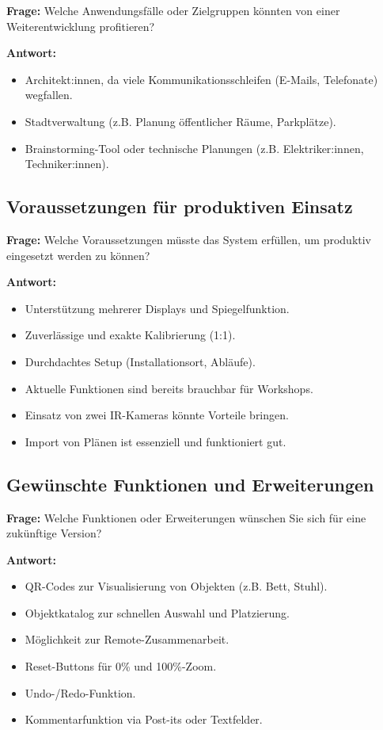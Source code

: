 \textbf{Frage:} Welche Anwendungsfälle oder Zielgruppen könnten von einer Weiterentwicklung profitieren?

\textbf{Antwort:}
\begin{itemize}
    \item Architekt:innen, da viele Kommunikationsschleifen (E-Mails, Telefonate) wegfallen.
    \item Stadtverwaltung (z.B. Planung öffentlicher Räume, Parkplätze).
    \item Brainstorming-Tool oder technische Planungen (z.B. Elektriker:innen, Techniker:innen).
\end{itemize}

\subsection{Voraussetzungen für produktiven Einsatz}

\textbf{Frage:} Welche Voraussetzungen müsste das System erfüllen, um produktiv eingesetzt werden zu können?

\textbf{Antwort:}
\begin{itemize}
    \item Unterstützung mehrerer Displays und Spiegelfunktion.
    \item Zuverlässige und exakte Kalibrierung (1:1).
    \item Durchdachtes Setup (Installationsort, Abläufe).
    \item Aktuelle Funktionen sind bereits brauchbar für Workshops.
    \item Einsatz von zwei IR-Kameras könnte Vorteile bringen.
    \item Import von Plänen ist essenziell und funktioniert gut.
\end{itemize}

\subsection{Gewünschte Funktionen und Erweiterungen}

\textbf{Frage:} Welche Funktionen oder Erweiterungen wünschen Sie sich für eine zukünftige Version?

\textbf{Antwort:}
\begin{itemize}
    \item QR-Codes zur Visualisierung von Objekten (z.B. Bett, Stuhl).
    \item Objektkatalog zur schnellen Auswahl und Platzierung.
    \item Möglichkeit zur Remote-Zusammenarbeit.
    \item Reset-Buttons für 0\% und 100\%-Zoom.
    \item Undo-/Redo-Funktion.
    \item Kommentarfunktion via Post-its oder Textfelder.
\end{itemize}

